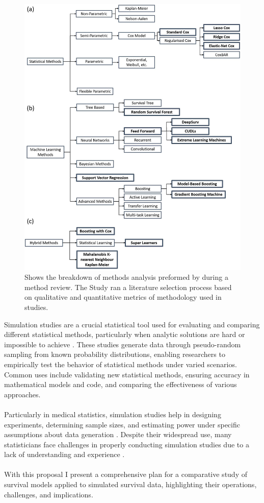 \begin{figure}
    \centering
    \includegraphics[scale=0.3]{Figures/ML_STATS_MODELS.jpg}
    \caption{Shows the breakdown of methods analysis preformed by \parencite{smith_scoping_2022} during a method review. The Study ran a literature selection process based on qualitative and quantitative metrics of methodology used in studies.}
    \label{fig:statsmodels}
\end{figure}

\pagebreak
\noindent Simulation studies are a crucial statistical tool used for evaluating and comparing different statistical methods, particularly when analytic solutions are hard or impossible to achieve \parencite{morris_using_2019}. These studies generate data through pseudo-random sampling from known probability distributions, enabling researchers to empirically test the behavior of statistical methods under varied scenarios. Common uses include validating new statistical methods, ensuring accuracy in mathematical models and code, and comparing the effectiveness of various approaches.
\\\\
\noindent Particularly in medical statistics, simulation studies help in designing experiments, determining sample sizes, and estimating power under specific assumptions about data generation \parencite{morris_using_2019}. Despite their widespread use, many statisticians face challenges in properly conducting simulation studies due to a lack of understanding and experience \parencite{morris_using_2019}. 
\\\\
\noindent With this proposal I present a comprehensive plan for a comparative study of survival models applied to simulated survival data, highlighting their operations, challenges, and implications.

